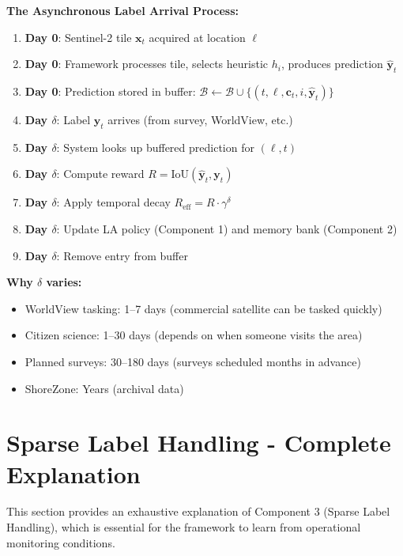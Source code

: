 \documentclass[11pt]{article}
\begin{document}
\textbf{The Asynchronous Label Arrival Process:}

\begin{enumerate}
    \item \textbf{Day 0}: Sentinel-2 tile $\mathbf{x}_t$ acquired at location $\ell$
    \item \textbf{Day 0}: Framework processes tile, selects heuristic $h_i$, produces prediction $\hat{\mathbf{y}}_t$
    \item \textbf{Day 0}: Prediction stored in buffer: $\mathcal{B} \leftarrow \mathcal{B} \cup \{(t, \ell, \mathbf{c}_t, i, \hat{\mathbf{y}}_t)\}$

    \item \textbf{Day $\delta$}: Label $\mathbf{y}_t$ arrives (from survey, WorldView, etc.)
    \item \textbf{Day $\delta$}: System looks up buffered prediction for $(\ell, t)$
    \item \textbf{Day $\delta$}: Compute reward $R = \text{IoU}(\hat{\mathbf{y}}_t, \mathbf{y}_t)$
    \item \textbf{Day $\delta$}: Apply temporal decay $R_{\text{eff}} = R \cdot \gamma^{\delta}$
    \item \textbf{Day $\delta$}: Update LA policy (Component 1) and memory bank (Component 2)
    \item \textbf{Day $\delta$}: Remove entry from buffer
\end{enumerate}

\textbf{Why $\delta$ varies:}
\begin{itemize}
    \item WorldView tasking: 1--7 days (commercial satellite can be tasked quickly)
    \item Citizen science: 1--30 days (depends on when someone visits the area)
    \item Planned surveys: 30--180 days (surveys scheduled months in advance)
    \item ShoreZone: Years (archival data)
\end{itemize}

\section{Sparse Label Handling - Complete Explanation}

This section provides an exhaustive explanation of Component 3 (Sparse Label Handling), which is essential for the framework to learn from operational monitoring conditions.
\end{document}
